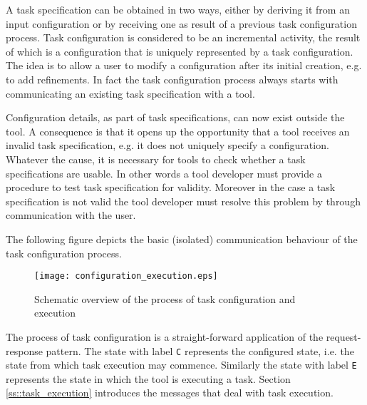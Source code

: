 \documentclass{article}
\begin{document}
   A task specification can be obtained in two ways, either by deriving it from
   an input configuration or by receiving one as result of a previous task
   configuration process. Task configuration is considered to be an incremental
   activity, the result of which is a configuration that is uniquely
   represented by a task configuration. The idea is to allow a user to modify a
   configuration after its initial creation, e.g. to add refinements.  In fact
   the task configuration process always starts with communicating an existing
   task specification with a tool.
   
   Configuration details, as part of task specifications, can now exist outside
   the tool.  A consequence is that it opens up the opportunity that a tool
   receives an invalid task specification, e.g. it does not uniquely specify a
   configuration. Whatever the cause, it is necessary for tools to check
   whether a task specifications are usable.  In other words a tool developer
   must provide a procedure to test task specification for validity. Moreover
   in the case a task specification is not valid the tool developer must resolve
   this problem by through communication with the user.

   The following figure depicts the basic (isolated) communication behaviour of
   the task configuration process.
   
   \begin{figure}[H]
    \begin{center}
     \texttt{[image: configuration\_execution.eps]}
    \end{center}
    \vspace{-0.3cm}
    \label{fig:configuration_execution}
    \caption{Schematic overview of the process of task configuration and execution}
   \end{figure}

   \noindent The process of task configuration is a straight-forward application of the
   request-response pattern. The state with label \texttt{C} represents the
   configured state, i.e. the state from which task execution may commence.
   Similarly the state with label \texttt{E} represents the state in which the
   tool is executing a task. Section \ref{ss::task_execution} introduces the
   messages that deal with task execution.

   
\end{document}
